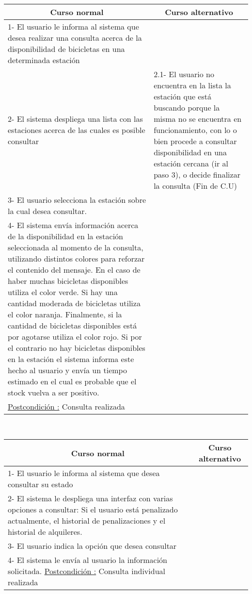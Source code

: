 ~

\begin{center}
    \centering
    \begin{tabular}{ | p{11cm} | p{6cm} | }
    	\multicolumn{1}{c}{\cellcolor{black!30}\textbf{Curso normal}} & 
    	\multicolumn{1}{c}{\cellcolor{black!30}\textbf{Curso alternativo}} \\
		\hline
		1- El usuario le informa al sistema que desea realizar una consulta acerca de la disponibilidad
		de bicicletas en una determinada estación & \\ \hline
		2- El sistema despliega una lista con las estaciones acerca de las cuales es posible consultar & 
		2.1- El usuario no encuentra en la lista la estación que está buscando porque la misma no se encuentra en
		funcionamiento, con lo o bien procede a consultar disponibilidad en una estación cercana (ir al paso 3), o
		decide finalizar la consulta (Fin de C.U)\\ \hline
		3- El usuario selecciona la estación sobre la cual desea consultar. & \\ \hline
		4- El sistema envía información acerca de la disponibilidad en la estación seleccionada al momento de la consulta, utilizando distintos colores para reforzar el contenido del mensaje. En el caso de haber muchas bicicletas disponibles utiliza el color verde. Si hay una cantidad moderada de bicicletas utiliza el color naranja. Finalmente,
		si la cantidad de bicicletas disponibles está por agotarse utiliza el color rojo. Si por el contrario no hay
		bicicletas disponibles en la estación el sistema informa este hecho al usuario y envía un tiempo estimado en el cual
		es probable que el stock vuelva a ser positivo. & \\ \hline
		\underline{Postcondición :} Consulta realizada & \\ \hline
    \end{tabular}
\end{center}	

~

\begin{center}
    \centering
    \begin{tabular}{ | p{11cm} | p{6cm} | }
    	\multicolumn{1}{c}{\cellcolor{black!30}\textbf{Curso normal}} & 
    	\multicolumn{1}{c}{\cellcolor{black!30}\textbf{Curso alternativo}} \\
		\hline
		1- El usuario le informa al sistema que desea consultar su estado & \\ \hline
		2- El sistema le despliega una interfaz con varias opciones a consultar:
		Si el usuario está penalizado actualmente, el historial de 
		penalizaciones y el historial de alquileres. & \\ \hline
		3- El usuario indica la opción que desea consultar & \\ \hline
		4- El sistema le envía al usuario la información solicitada.
		\underline{Postcondición :} Consulta individual realizada & \\ \hline
    \end{tabular}
\end{center}

